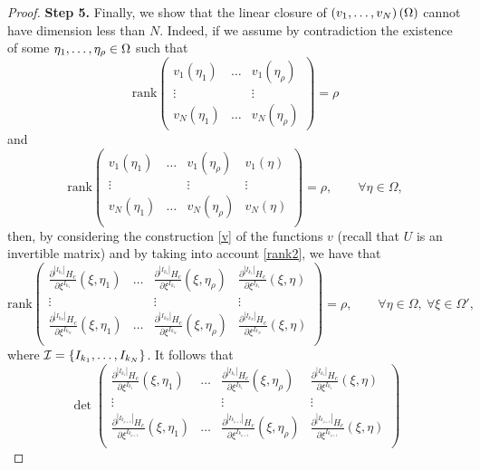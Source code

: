 \documentclass{article}
\newcommand{\I}{\mathcal{I}}
\newcommand{\de}{\partial}
\begin{document}
\begin{proof}
\medskip\noindent
\textbf{\large Step 5.} 
Finally, we  show that  the linear closure of $(v_1,\mathellipsis,v_N)\left(\Omega\right)$ cannot have dimension  less than $N$. Indeed, if we assume by contradiction  the  existence of some $\eta_1,\mathellipsis,\eta_\rho\in\Omega$ such that
\begin{equation}	\label{rank1}
\mathrm{rank} \begin{pmatrix}
v_1(\eta_1)&\dots&v_1(\eta_\rho)\\
\vdots & &\vdots\\
 v_N(\eta_1)&\dots& v_N(\eta_\rho)
\end{pmatrix}= \rho
\end{equation}
 and 
\begin{equation}	\label{rank2}
\mathrm{rank} \begin{pmatrix}
v_1(\eta_1)&\dots&v_1(\eta_\rho)&v_1(\eta)\\
\vdots & &\vdots&\vdots\\
 v_N(\eta_1)&\dots& v_N(\eta_\rho)&v_N(\eta)\\
\end{pmatrix}= \rho,\qquad \forall \eta\in\Omega,\end{equation}
then, by considering the construction \eqref{v} of the functions $v$ (recall that $U$ is an invertible matrix) and  by taking into account \eqref{rank2},   we have that
$$\mathrm{rank} \begin{pmatrix}
\frac{\de^{| I_{k_1}| }H_c}{\de \xi^{I_{k_1}}}(\xi,\eta_1)&\dots& \frac{\de^{| I_{k_1}| }H_c}{\de \xi^{I_{k_1}}}(\xi,\eta_\rho)&\frac{\de^{|I_{k_1} | }H_c}{\de \xi^{I_{k_1}}}(\xi,\eta)\\
\vdots & &\vdots&\vdots\\
\frac{\de^{|I_{k_N} | }H_c}{\de \xi^{I_{k_N}}}(\xi,\eta_1)&\dots& \frac{\de^{|I_{k_N} | }H_c}{\de \xi^{I_{k_N}}}(\xi,\eta_\rho)&\frac{\de^{| I_{k_N}| }H_c}{\de \xi^{I_{k_N}}}(\xi,\eta)\\
\end{pmatrix}= \rho,\qquad \forall \eta\in\Omega,\ \forall \xi\in\Omega',$$
where $\I=\{I_{k_1},\mathellipsis,I_{k_N}\}$. It follows that
$$\det \begin{pmatrix}
\frac{\de^{| I_{k_1}| }H_c}{\de \xi^{I_{k_1}}}(\xi,\eta_1)&\dots& \frac{\de^{| I_{k_1}| }H_c}{\de \xi^{I_{k_1}}}(\xi,\eta_\rho)&\frac{\de^{|I_{k_1} | }H_c}{\de \xi^{I_{k_1}}}(\xi,\eta)\\
\vdots & &\vdots&\vdots\\
\frac{\de^{|I_{k_{\rho+1}} | }H_c}{\de \xi^{I_{k_{\rho+1}}}}(\xi,\eta_1)&\dots& \frac{\de^{|I_{k_{\rho+1}} | }H_c}{\de \xi^{I_{k_{\rho+1}}}}(\xi,\eta_\rho)&\frac{\de^{| I_{k_{\rho+1}}| }H_c}{\de \xi^{I_{k_{\rho+1}}}}(\xi,\eta)\\

\end{pmatrix}$$
\end{proof}
\end{document}
